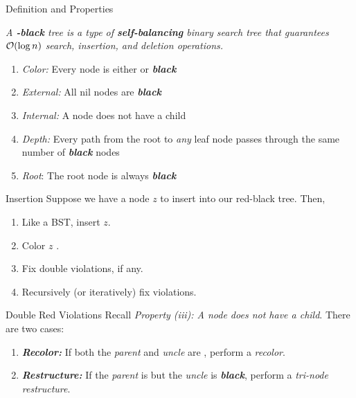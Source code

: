 \documentclass[aspectratio=169]{beamer}
\newcommand{\textib}[1]{\textit{\textbf{{#1}}}}
\newcommand{\red}{\textib{\color{red}{red }}}
\newcommand{\define}[1]{\begin{tcolorbox}[title={Definition}]\small{\textit{{#1}}}\end{tcolorbox}}
\begin{document}
\begin{frame}[fragile]{Definition and Properties}
    \define{
        A \textib{\color{red}{red}}\textib{-black} tree is a type of \textib{self-balancing} binary 
        search tree that guarantees ${\cal{O}}(\log n)$ search, insertion, and deletion operations.
    }
    \begin{enumerate}[label=\textit{(\roman*)}]
        \item \textit{Color:} Every node is either \red or \textib{black}
        \item \textit{External:} All nil nodes are \textib{black}
        \item \textit{Internal:} A \red node does not have a \red child
        \item \textit{Depth:} Every path from the root to \textit{any} leaf node passes through
            the same number of \textib{black} nodes
        \item \textit{Root}: The root node is always \textib{black}
    \end{enumerate}
\end{frame}

\begin{frame}{Insertion}
    Suppose we have a node $z$ to insert into our red-black tree. Then,
    \begin{enumerate}[label=\textit{(\roman*)}]
        \item Like a BST, insert $z$.
        \item Color $z$ \red.
        \item Fix double \red violations, if any.
        \item Recursively (or iteratively) fix violations.
    \end{enumerate}
\end{frame}

\begin{frame}{Double Red Violations}
    Recall \textit{Property (iii): A \red node does not have a \red child}. 
    \newline
    There are two cases:
    \begin{enumerate}[label=\textit{(\roman*)}]
        \item \textib{Recolor:} If both the \textit{parent} and \textit{uncle} are 
            \textib{\color{red}{red}}, perform a \textit{recolor}.
        \item \textib{Restructure:} If the \textit{parent} is \red but the \textit{uncle} is 
            \textib{black}, perform a \textit{tri-node restructure}.
    \end{enumerate}
\end{frame}
\end{document}
